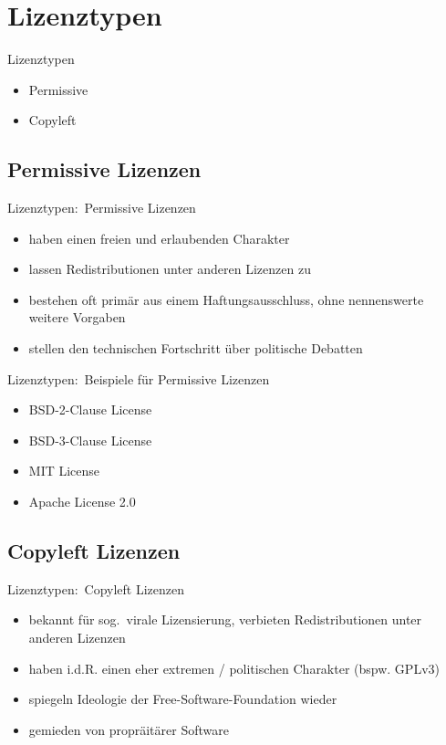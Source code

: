 \documentclass{beamer}
\begin{document}
\section{Lizenztypen}
\begin{frame}{Lizenztypen}
	\begin{itemize}
		\item Permissive
		\item Copyleft
	\end{itemize}
\end{frame}

\subsection{Permissive Lizenzen}
\begin{frame}{Lizenztypen:\ Permissive Lizenzen}
	\begin{itemize}
		\item haben einen freien und erlaubenden Charakter
		\item lassen Redistributionen unter anderen Lizenzen zu
		\item bestehen oft primär aus einem Haftungsausschluss, ohne
			nennenswerte weitere Vorgaben
		\item stellen den technischen Fortschritt über politische Debatten
	\end{itemize}
\end{frame}

\begin{frame}{Lizenztypen:\ Beispiele für Permissive Lizenzen}
	\begin{itemize}
		\item BSD-2-Clause License
		\item BSD-3-Clause License
		\item MIT License
		\item Apache License 2.0
	\end{itemize}
\end{frame}

\subsection{Copyleft Lizenzen}
\begin{frame}{Lizenztypen:\ Copyleft Lizenzen}
	\begin{itemize}
		\item bekannt für sog.\ virale Lizensierung,
			verbieten Redistributionen unter anderen Lizenzen
		\item haben i.d.R. einen eher extremen / politischen Charakter (bspw. GPLv3)
		\item spiegeln Ideologie der Free-Software-Foundation wieder
		\item gemieden von propräitärer Software
	\end{itemize}
\end{frame}
\end{document}
